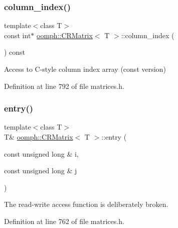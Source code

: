 \subsubsection{\texorpdfstring{column\+\_\+index()}{column\_index()}\hspace{0.1cm}{\footnotesize\ttfamily [2/2]}}
{\footnotesize\ttfamily template$<$class T$>$ \\
const int$\ast$ \hyperlink{classoomph_1_1CRMatrix}{oomph\+::\+C\+R\+Matrix}$<$ T $>$\+::column\+\_\+index (\begin{DoxyParamCaption}{ }\end{DoxyParamCaption}) const\hspace{0.3cm}{\ttfamily [inline]}}



Access to C-\/style column index array (const version) 



Definition at line 792 of file matrices.\+h.

\mbox{\label{classoomph_1_1CRMatrix_a5ad8bd622cd8929c4fea17cf057f0a73}} 
\subsubsection{\texorpdfstring{entry()}{entry()}}
{\footnotesize\ttfamily template$<$class T$>$ \\
T\& \hyperlink{classoomph_1_1CRMatrix}{oomph\+::\+C\+R\+Matrix}$<$ T $>$\+::entry (\begin{DoxyParamCaption}\item[{const unsigned long \&}]{i,  }\item[{const unsigned long \&}]{j }\end{DoxyParamCaption})\hspace{0.3cm}{\ttfamily [inline]}}



The read-\/write access function is deliberately broken. 



Definition at line 762 of file matrices.\+h.

\mbox{\label{classoomph_1_1CRMatrix_afc7fe758067c8ab3fe2dba96a4258492}} 
